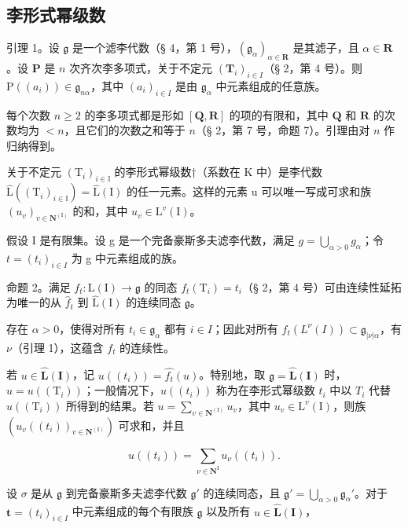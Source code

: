 \subsection{李形式幂级数}

引理 1。设 \(\mathfrak{g}\) 是一个滤李代数（§ 4，第 1 号），\((\mathfrak{g}_{\alpha})_{\alpha \in \mathbf{R}}\) 是其滤子，且 \(\alpha \in \mathbf{R}\)。设 \(\mathbf{P}\) 是 \(n\) 次齐次李多项式，关于不定元 \((\mathbf{T}_i)_{i \in I}\)（§ 2，第 4 号）。则 \(\mathrm{P}((a_i)) \in \mathfrak{g}_{n\alpha}\)，其中 \((a_i)_{i \in I}\) 是由 \(\mathfrak{g}_{\alpha}\) 中元素组成的任意族。

每个次数 \(n \geqslant 2\) 的李多项式都是形如 \([\mathbf{Q}, \mathbf{R}]\) 的项的有限和，其中 \(\mathbf{Q}\) 和 \(\mathbf{R}\) 的次数均为 \(< n\)，且它们的次数之和等于 \(n\)（§ 2，第 7 号，命题 7）。引理由对 \(n\) 作归纳得到。

关于不定元 \((\mathrm{T}_{i})_{i\in\mathbb{I}}\) 的李形式幂级数†（系数在 K 中）是李代数 \(\hat{\mathrm{L}}((\mathrm{T}_{i})_{i\in\mathbb{I}})=\hat{\mathrm{L}}(\mathrm{I})\) 的任一元素。这样的元素 u 可以唯一写成可求和族 \((u_{v})_{v\in\mathbf{N}^{(\mathrm{I})}}\) 的和，其中 \(u_{v}\in\mathrm{L}^{v}(\mathrm{I})\)。

假设 I 是有限集。设 g 是一个完备豪斯多夫滤李代数，满足 \(g = \bigcup_{\alpha > 0} g_{\alpha}\)；令 \(t = (t_i)_{i \in I}\) 为 g 中元素组成的族。

命题 2。满足 \(f_{t} \colon \mathrm{L}(\mathrm{I}) \to \mathfrak{g}\) 的同态 \(f_{t}(\mathrm{T}_{i}) = t_{i}\)（§ 2，第 4 号）可由连续性延拓为唯一的从 \(\hat{f}_{t}\) 到 \(\hat{\mathrm{L}}(\mathrm{I})\) 的连续同态 \(\mathfrak{g}\)。

存在 \(\alpha > 0\)，使得对所有 \(t_i \in \mathfrak{g}_\alpha\) 都有 \(i \in I\)；因此对所有 \(f_t(L^\nu(I)) \subset \mathfrak{g}_{|\nu| \alpha}\)，有 \(\nu\)（引理 1），这蕴含 \(f_t\) 的连续性。

若 \(u \in \widehat{\mathbf{L}}(\mathbf{I})\)，记 \(u((t_i)) = \widehat{f_t}(u)\)。特别地，取 \(\mathfrak{g} = \widehat{\mathbf{L}}(\mathbf{I})\) 时，\(u = u((\mathrm{T}_i))\)；一般情况下，\(u((t_i))\) 称为在李形式幂级数 \(t_i\) 中以 \(T_i\) 代替 \(u((\mathrm{T}_i))\) 所得到的结果。若 \(u = \sum_{v \in \mathbf{N}^{(\mathrm{I})}} u_v\)，其中 \(u_v \in \mathrm{L}^v(\mathrm{I})\)，则族 \((u_v((t_i))_{v \in \mathbf{N}^{(\mathrm{I})}})\) 可求和，并且

\[
u ((t _ {i})) = \sum_ {\nu \in \mathbf {N} ^ {\mathrm{I}}} u _ {\nu} ((t _ {i})).\tag{5}
\]

设 \(\sigma\) 是从 \(\mathfrak{g}\) 到完备豪斯多夫滤李代数 \(\mathfrak{g}'\) 的连续同态，且 \(\mathfrak{g}' = \bigcup_{\alpha > 0} \mathfrak{g}_{\alpha}'\)。对于 \(\boldsymbol{t} = (t_i)_{i \in I}\) 中元素组成的每个有限族 \(\mathfrak{g}\) 以及所有 \(u \in \hat{\mathbf{L}}(\mathbf{I})\)，

